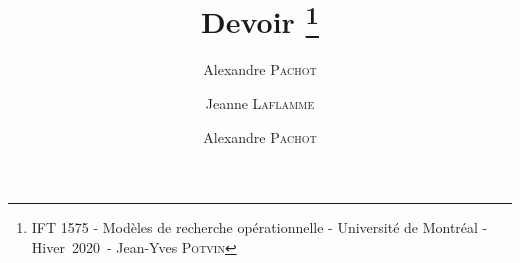 \documentclass[10pt,twocolumn]{article}
\title{Devoir \no 2\thanks{IFT 1575 - Modèles de recherche opérationnelle - Université de Montréal - Hiver~2020~- Jean-Yves \textsc{Potvin}}}
\author{Alexandre \textsc{Pachot}}
\author{Jeanne \textsc{Laflamme} \and Alexandre \textsc{Pachot}}
\begin{document}
	
	\maketitle
	\renewcommand{\contentsname}{}
	\tableofcontents
	
	
	
	
	
	
	
\end{document}
